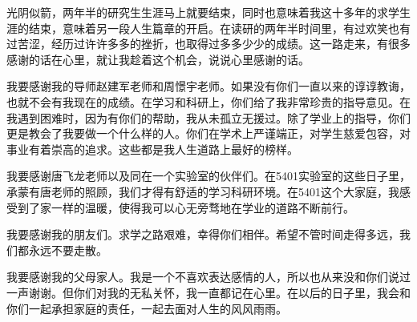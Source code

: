 
\begin{thanks}
光阴似箭，两年半的研究生生涯马上就要结束，同时也意味着我这十多年的求学生涯的结束，意味着另一段人生篇章的开启。在读研的两年半时间里，有过欢笑也有过苦涩，经历过许许多多的挫折，也取得过多多少少的成绩。这一路走来，有很多感谢的话在心里，就让我趁着这个机会，说说心里感谢的话。

我要感谢我的导师赵建军老师和周憬宇老师。如果没有你们一直以来的谆谆教诲，也就不会有我现在的成绩。在学习和科研上，你们给了我非常珍贵的指导意见。在我遇到困难时，因为有你们的帮助，我从未孤立无援过。除了学业上的指导，你们更是教会了我要做一个什么样的人。你们在学术上严谨端正，对学生慈爱包容，对事业有着崇高的追求。这些都是我人生道路上最好的榜样。

我要感谢唐飞龙老师以及同在一个实验室的伙伴们。在5401实验室的这些日子里，承蒙有唐老师的照顾，我们才得有舒适的学习科研环境。在5401这个大家庭，我感受到了家一样的温暖，使得我可以心无旁骛地在学业的道路不断前行。

我要感谢我的朋友们。求学之路艰难，幸得你们相伴。希望不管时间走得多远，我们都永远不要走散。

我要感谢我的父母家人。我是一个不喜欢表达感情的人，所以也从来没和你们说过一声谢谢。但你们对我的无私关怀，我一直都记在心里。在以后的日子里，我会和你们一起承担家庭的责任，一起去面对人生的风风雨雨。

\end{thanks}

